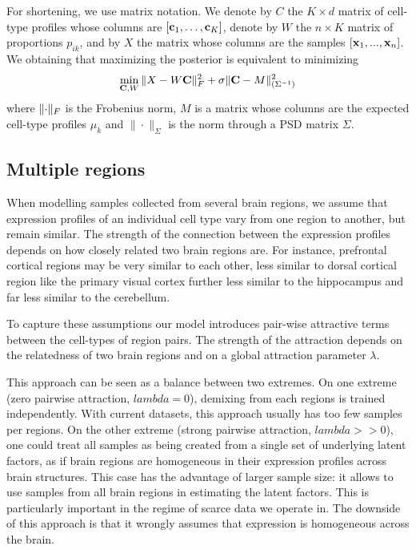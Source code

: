 For shortening, we use matrix notation. We denote by $C$ the $K \times d$ matrix of cell-type profiles whose columns are $\left[{\mathbf{c}_1, \ldots, \mathbf{c}_K}\right]$, denote by $W$ the $n \times K$ matrix of proportions $p_{ik}$,
and by $X$ the matrix whose columns are the samples $\left[{\mathbf{x}_1,..., \mathbf{x}_n}\right]$.
We obtaining that maximizing the posterior is equivalent to minimizing 
\begin{equation}
    \label{eq-single}
    \min_{\mathbf{C}, W} \|{X - W \mathbf{C}}\|_F^2 + \sigma \|{ \mathbf{C} - M }\|^2_{(\Sigma^{-1})}
\end{equation}
where $\|{\cdot}\|_F$ is the Frobenius norm, $M$ is a matrix whose columns are the expected cell-type profiles $\mu_k$ and  $\|\cdot\|_{\Sigma}$ is the norm through a PSD matrix $\Sigma$.


\subsection{Multiple regions}
When modelling samples collected from several brain regions, we assume that expression profiles of an individual cell type vary from one region to another, but remain similar. The strength of the connection between the expression profiles depends on how closely related two brain regions are. For instance, prefrontal cortical regions may be very similar to each other, less similar to dorsal cortical region like the primary visual cortex further less similar to the hippocampus and far less similar to the cerebellum. 

To capture these assumptions our model introduces pair-wise attractive terms between the cell-types of region pairs. The strength of the attraction depends on the relatedness of two brain regions and on a global attraction parameter $\lambda$.

This approach can be seen as a balance between two extremes. On one extreme (zero pairwise attraction, $lambda=0$), demixing from each regions is trained independently. With current datasets, this approach usually has too few samples per regions.  On the other extreme (strong pairwise attraction, $lambda >> 0$), one could treat all samples as being created from a single set of underlying latent factors, as if brain regions are homogeneous in their expression profiles across brain structures. This case has the advantage of larger sample size:  it allows to use samples from all brain regions in estimating the latent factors. This is particularly important in the regime of scarce data we operate in. The downside of this approach is that it wrongly assumes that expression is homogeneous across the brain. 

